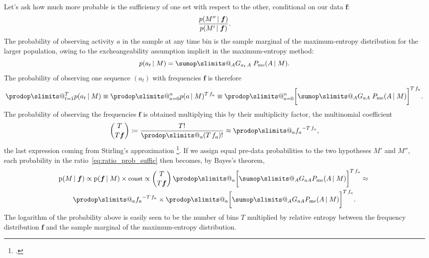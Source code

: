 \documentclass[\ifafour a4paper,12pt,\else a5paper,10pt,\fi%
onecolumn,oneside,article,%
british%
]{memoir}
\makeatletter
\theoremstyle{remark}
\theoremstyle{innote}
\def\sum{\DOTSI\sumop\slimits@}
\def\prod{\DOTSI\prodop\slimits@}
\newcommand*{\citep}{\footcites}
\newcommand*{\defd}{\coloneqq}
\newcommand*{\pf}{\mathrm{p}}%
\renewcommand*{\|}{\nonscript\,\vert\nonscript\;\mathopen{}}
\newcommand*{\yG}{G}
\newcommand*{\yAv}{A}
\newcommand*{\yav}{a}
\newcommand*{\yff}{f}
\newcommand*{\yf}{\bm{\yff}}
\newcommand*{\ya}{\yav}%
\newcommand*{\yA}{\yAv}%
\newcommand*{\px}{P_{\text{me}}}
\newcommand*{\pxx}{p}
\makeatother
\begin{document}
Let's ask how much more probable is the
sufficiency of one set with respect to the other, conditional on our data
$\yf$:
\begin{equation}
  \label{eq:ratio_prob_suffic}
  \frac{p(M'' \| \yf)}{ p(M' \| \yf)}.
\end{equation}
The probability of observing activity $\ya$ in the sample at any time bin
is the sample marginal of the maximum-entropy distribution for the larger
population, owing to the excheangeability assumption implicit in the
maximum-entropy method:
\begin{equation}
  \label{eq:sample_marginal}
  \pxx(\ya_{t} \| M) = \sum_{\yA}\yG_{\ya_{t}\,\yA}\;\px(\yA \| M).
\end{equation}
The probability of observing one sequence $(\ya_{t})$ with frequencies
$\yf$ is therefore
\begin{equation}
  \label{eq:prob_frequencies}
  \prod_{t=1}^{T} \pxx(\ya_{t} \| M) \equiv
  \prod_{\ya=0}^{n} \pxx(\ya \| M)^{T\,\yff_{\ya}} \equiv
  \prod_{\ya=0}^{n}\biggl[\sum_{\yA}\yG_{\ya\yA}\;\px(\yA \| M)\biggr]^{T\,\yff_{\ya}}.
\end{equation}
The probability of observing the frequencies $\yf$ is obtained multiplying this
by their multiplicity factor, the multinomial coefficient
\begin{equation}
  \label{eq:multiplicity_factor}
  \binom{T}{T\yf} \defd \frac{T!}{\prod_{\ya}(T\,\yff_{\ya})!}
  \approx \prod_{\ya}{\yff_{\ya}}^{-T\,\yff_{\ya}},
\end{equation}
the last expression coming from Stirling's approximation
\citep[Lemma~2.2]{csiszaretal2004b}.
If we assign equal pre-data probabilities to the two hypotheses $M'$ and $M''$,
each probability in the ratio~\eqref{eq:ratio_prob_suffic} then becomes, by
Bayes's theorem,
\begin{multline}
  \label{eq:prob_proportional_relentropy}
  \pf(M \| \yf) \propto
  \pf(\yf \| M) \times\text{\small const} \propto
  \binom{T}{T\yf}\,  \prod_{\ya}\biggl[\sum_{\yA}\yG_{\ya\yA}\px(\yA \| M)\biggr]^{
    T\,\yff_{\ya}}
   \approx{}\\
  \prod_{\ya}{\yff_{\ya}}^{-T\,\yff_{\ya}}
  \times
  \prod_{\ya}\biggl[\sum_{\yA}\yG_{\ya\yA}\px(\yA \| M)\biggr]^{
    T\,\yff_{\ya}}.
\end{multline}
The logarithm of the probability above is easily seen to be the number of
bins $T$ multiplied by relative entropy between the frequency distribution
$\yf$ and the sample marginal of the maximum-entropy distribution.
\end{document}
